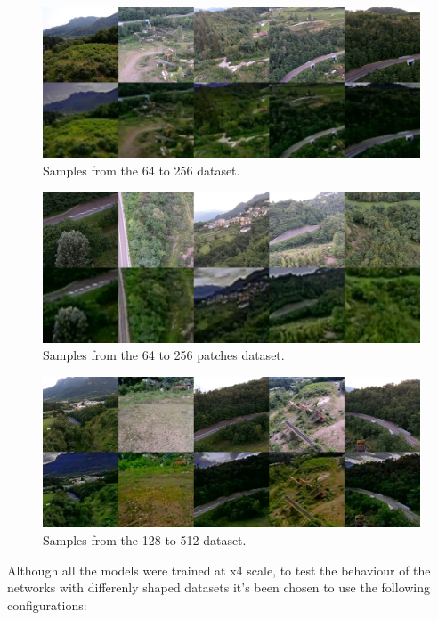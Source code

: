 \begin{figure}[H]
  \centering
  \includegraphics[scale=0.4]{figures/final_64_256.png}
  \caption{Samples from the 64 to 256 dataset.}
  \label{img:64_256}
\end{figure}

\begin{figure}[H]
  \centering
  \includegraphics[scale=0.4]{figures/final_64_256_patches.png}
  \caption{Samples from the 64 to 256 patches dataset.}
  \label{img:64_256_p}
\end{figure}

\begin{figure}[H]
  \centering
  \includegraphics[scale=0.4]{figures/final_128_512.png}
  \caption{Samples from the 128 to 512 dataset.}
  \label{img:128_512}
\end{figure}


Although all the models were trained at x4 scale, to test the behaviour of the networks with differenly shaped datasets it's been chosen to use the following configurations:

